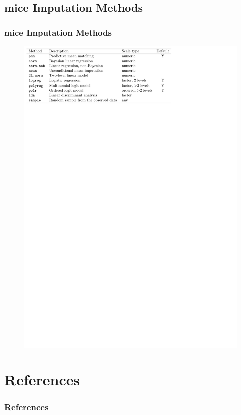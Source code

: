 \documentclass[UKenglish
  pdftex                    %
  dvipsnames                %
]{beamer}
\newcommand{\pk}[1]{\textcolor{Rblue}{\textsf{#1}}}
\begin{document}
\subsection{\pk{mice} Imputation Methods}
\begin{frame}\frametitle{\pk{mice} Imputation Methods}

\begin{figure}
  \centering
  \includegraphics[width=\textwidth]{./Figures/methods.pdf}
\end{figure}

\end{frame}

\section{References}
\begin{frame}%
\frametitle{References}

\printbibliography

\end{frame}
\end{document}
